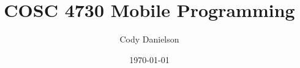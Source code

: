 \title{COSC 4730 Mobile Programming} %
\def\homework{Program 2}
\def\github{github repo: \url{cosc4730fa24/mp_program2-cojoda.git}}
\author{Cody Danielson}
\date{\today}